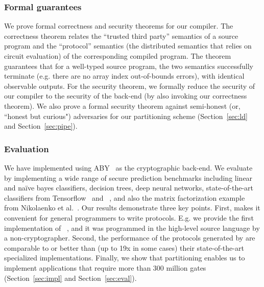
\subsubsection*{Formal guarantees} We prove formal correctness and
security theorems for our compiler. The correctness theorem relates the
``trusted third party'' semantics of a source
program and the ``protocol'' semantics (the distributed \mpc
semantics that relies on circuit evaluation) of the corresponding
compiled program. The theorem
guarantees that for a well-typed source program, the two semantics
successfully terminate
(e.g. there are no array index out-of-bounds errors), with identical
observable outputs. For
the security theorem, we formally reduce the security
of our compiler to the security of the  \mpc back-end
 (by also invoking our correctness theorem). We also prove a formal security theorem against semi-honest (or, ``honest but curious") adversaries for our partitioning
scheme (Section~\ref{sec:ld} and Section~\ref{sec:pipe}).

\subsubsection*{Evaluation} We have implemented \tool
using ABY~\cite{aby} as the
cryptographic back-end. We evaluate \tool by implementing a wide range
of secure prediction benchmarks including linear and na\"{i}ve bayes
classifiers, decision trees, deep neural networks, state-of-the-art
classifiers from Tensorflow~\cite{tensorflow}
and \bonsai~\cite{bonsai}, and also the matrix factorization example
from Nikolaenko et al.~\cite{valeriaMatrix}. Our results demonstrate
three key points. First, \tool makes it convenient for general
programmers to write \mpc protocols. E.g. we provide the first \mpc
implementation of \bonsai~\cite{bonsai}, and it was programmed in the
high-level \tool source language by a non-cryptographer. Second, the
performance
of the protocols
generated by \tool are comparable to or better than (up to 19x in some
cases) their state-of-the-art specialized implementations. Finally, we
show that partitioning enables us to implement applications
that require more than 300 million gates (Section~\ref{sec:impl} and
Section~\ref{sec:eval}).

